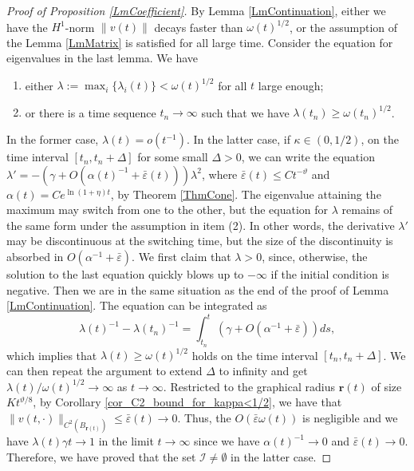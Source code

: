 \documentclass[11pt]{amsart}
\numberwithin{equation}{section}
\numberwithin{equation}{section}
\newcommand{\eps}{\varepsilon}
\newcommand{\br}{\mathbf{r}}
\begin{document}
	\begin{proof}[Proof of Proposition \ref{LmCoefficient}]
		By Lemma \ref{LmContinuation}, either we have the $H^1$-norm $\|v(t)\|$ decays faster than $\omega(t)^{1/2}$, or the assumption of the Lemma \ref{LmMatrix} is satisfied for all large time. Consider the equation for eigenvalues in the last lemma. We have
		\begin{enumerate}
			\item either $\lambda:=\max_i\{\lambda_i(t)\}<\omega(t)^{1/2}$ for all $t$ large enough; 
			\item or there is a time sequence $t_n\to\infty$ such that we have $\lambda(t_n)\geq \omega(t_n)^{1/2}$.
		\end{enumerate}
		
		
		In the former case, $\lambda(t)=o(t^{-1})$. In the latter case, if $\kappa\in(0,1/2)$, on the time interval $[t_n,t_n+\Delta]$ for some small $\Delta>0$, we can write the equation $\lambda'=-(\gamma+O(\alpha(t)^{-1}+\bar \eps(t)))\lambda^2$, where $\bar\eps(t)\leq Ct^{-\vartheta}$ and $\alpha(t)=Ce^{\ln(1+\eta)t}$, by Theorem \ref{ThmCone}. The eigenvalue attaining the maximum may switch from one to the other, but the equation for $\lambda$ remains of the same form under the assumption in item (2). In other words, the derivative $\lambda'$ may be discontinuous at the switching time, but the size of the discontinuity is absorbed in $O(\alpha^{-1}+\bar\eps).$
		We first claim that $\lambda>0$, since, otherwise, the solution to the last equation quickly blows up to $-\infty$ if the initial condition is negative. 
		Then we are in the same situation as the end of the proof of Lemma \ref{LmContinuation}. The equation can be integrated as $$\lambda(t)^{-1}-\lambda(t_n)^{-1}=\int_{t_n}^t(\gamma+O(\alpha^{-1}+\bar\eps)) ds,$$ which implies that $\lambda(t)\geq \omega(t)^{1/2}$ holds on the time interval $[t_n,t_n+\Delta]$. We can then repeat the argument to extend $\Delta$ to infinity and get $\lambda(t)/ \omega(t)^{1/2}\to\infty$ as $t\to\infty$. Restricted to the graphical radius $\br(t)$ of size $K t^{\vartheta/8}$, by Corollary \ref{cor_C2_bound_for_kappa<1/2}, we have that $\|v(t,\cdot)\|_{C^2(B_{\br(t)})}\leq \bar\eps(t)\to 0$. Thus, the $O(\bar\eps\omega(t))$ is negligible and we have $\lambda(t)\gamma t\to 1$ in the limit $t\to\infty$ since we have $\alpha(t)^{-1}\to0$ and $\bar\eps(t)\to0$. Therefore, we have proved that the set $\mathcal I\neq\emptyset$ in the latter case. 
		

\end{proof}
\end{document}
